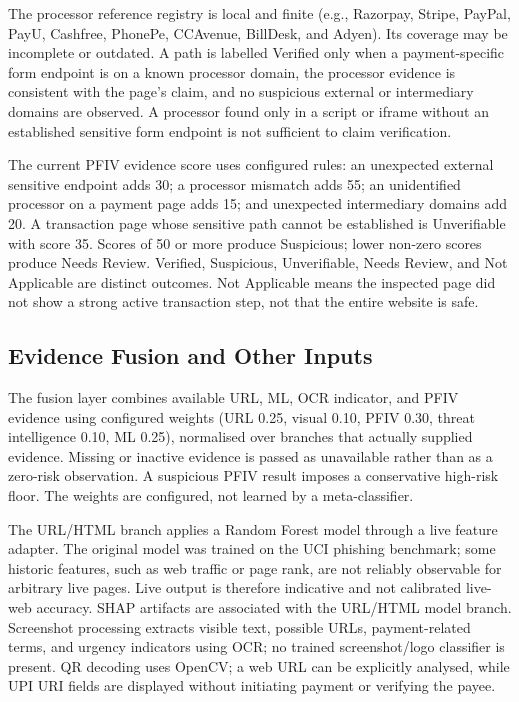 \documentclass[conference]{IEEEtran}
\begin{document}
The processor reference registry is local and finite (e.g., Razorpay, Stripe, PayPal, PayU, Cashfree, PhonePe, CCAvenue, BillDesk, and Adyen). Its coverage may be incomplete or outdated. A path is labelled Verified only when a payment-specific form endpoint is on a known processor domain, the processor evidence is consistent with the page's claim, and no suspicious external or intermediary domains are observed. A processor found only in a script or iframe without an established sensitive form endpoint is not sufficient to claim verification.

The current PFIV evidence score uses configured rules: an unexpected external sensitive endpoint adds 30; a processor mismatch adds 55; an unidentified processor on a payment page adds 15; and unexpected intermediary domains add 20. A transaction page whose sensitive path cannot be established is Unverifiable with score 35. Scores of 50 or more produce Suspicious; lower non-zero scores produce Needs Review. Verified, Suspicious, Unverifiable, Needs Review, and Not Applicable are distinct outcomes. Not Applicable means the inspected page did not show a strong active transaction step, not that the entire website is safe.

\subsection{Evidence Fusion and Other Inputs}
The fusion layer combines available URL, ML, OCR indicator, and PFIV evidence using configured weights (URL 0.25, visual 0.10, PFIV 0.30, threat intelligence 0.10, ML 0.25), normalised over branches that actually supplied evidence. Missing or inactive evidence is passed as unavailable rather than as a zero-risk observation. A suspicious PFIV result imposes a conservative high-risk floor. The weights are configured, not learned by a meta-classifier.

The URL/HTML branch applies a Random Forest model through a live feature adapter. The original model was trained on the UCI phishing benchmark; some historic features, such as web traffic or page rank, are not reliably observable for arbitrary live pages. Live output is therefore indicative and not calibrated live-web accuracy. SHAP artifacts are associated with the URL/HTML model branch. Screenshot processing extracts visible text, possible URLs, payment-related terms, and urgency indicators using OCR; no trained screenshot/logo classifier is present. QR decoding uses OpenCV; a web URL can be explicitly analysed, while UPI URI fields are displayed without initiating payment or verifying the payee.
\end{document}
